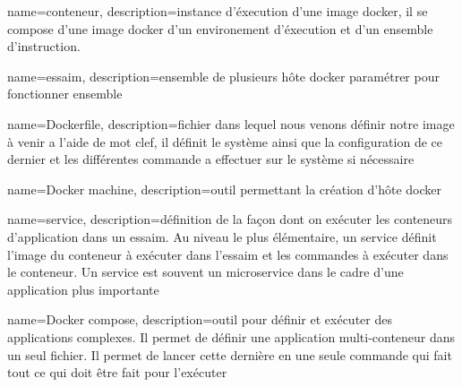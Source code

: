 {
  name={conteneur},
  description={instance d’éxecution d’une image docker, il se compose d’une image docker d’un environement d’éxecution et d’un ensemble d’instruction.}
}

{
  name={essaim},
  description={ensemble de plusieurs hôte docker paramétrer pour fonctionner ensemble}
}

{
  name={Dockerfile},
  description={fichier dans lequel nous venons définir notre image à venir  a l’aide de mot clef, il définit le système ainsi que la configuration de ce dernier et les différentes commande a effectuer sur le système si nécessaire }
}

{
  name=Docker machine,
  description={outil permettant la création d’hôte docker }
}

{
  name=service,
  description={définition de la façon dont on exécuter les conteneurs d'application dans un essaim. Au niveau le plus élémentaire, un service définit l'image du conteneur à exécuter dans l'essaim et les commandes à exécuter dans le conteneur. Un service est souvent un microservice dans le cadre d'une application plus importante}
}

{
  name=Docker compose,
  description={outil pour définir et exécuter des applications complexes. Il permet de définir  une application multi-conteneur dans un seul fichier. Il permet de lancer cette dernière en une seule commande qui fait tout ce qui doit être fait pour l'exécuter}
}
